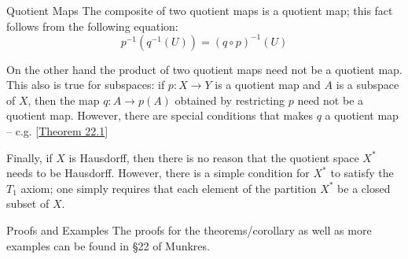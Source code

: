 \begin{remarkBox}{Quotient Maps}
    The composite of two quotient maps is a quotient map; this fact follows 
    from the following equation:
    \begin{equation*}
        p^{ -1 } ( q^{ -1 } ( U ) )
        =
        ( q \circ p )^{ -1 } ( U )
    \end{equation*}

    \baseRule

    On the other hand the product of two quotient maps need not be a quotient
    map.
    This also is true for subspaces: if \( p: X \rightarrow Y \) is a quotient
    map and \( A \) is a subspace of \( X \), then the map \( q: A \rightarrow 
    p ( A ) \) obtained by restricting \( p \) need not be a quotient map.
    However, there are special conditions that makes \( q \) a quotient map --
    c.g. [\hyperlink{thm:22.1}{Theorem 22.1}]

    \baseRule

    Finally, if \( X \) is Hausdorff, then there is no reason that the quotient
    space \( X^{ * } \) needs to be Hausdorff.
    However, there is a simple condition for \( X^{ * } \) to satisfy the 
    \( T_{ 1 } \) axiom; one simply requires that each element of the 
    partition \( X^{ * } \) be a closed subset of \( X \).
\end{remarkBox}

\begin{remarkBox}{Proofs and Examples}
    The proofs for the theorems/corollary as well as more examples can be found
    in \S 22 of Munkres.
\end{remarkBox}